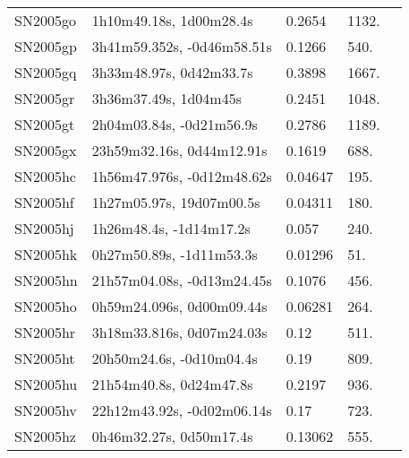 \begin{longtable}{lllll}
         SN2005go &        1h10m49.18s, 1d00m28.4s &   0.2654 &          1132. &    \citet{2011ApJ...740...92G} \\
         SN2005gp &     3h41m59.352s, -0d46m58.51s &   0.1266 &           540. &    \citet{2016SDSSD.C...0000:} \\
         SN2005gq &        3h33m48.97s, 0d42m33.7s &   0.3898 &          1667. &    \citet{2011ApJ...740...92G} \\
         SN2005gr &          3h36m37.49s, 1d04m45s &   0.2451 &          1048. &    \citet{2011ApJ...740...92G} \\
         SN2005gt &       2h04m03.84s, -0d21m56.9s &   0.2786 &          1189. &    \citet{2011ApJ...740...92G} \\
         SN2005gx &      23h59m32.16s, 0d44m12.91s &   0.1619 &           688. &    \citet{2011ApJ...740...92G} \\
         SN2005hc &     1h56m47.976s, -0d12m48.62s &  0.04647 &           195. &    \citet{2016SDSSD.C...0000:} \\
         SN2005hf &       1h27m05.97s, 19d07m00.5s &  0.04311 &           180. &  \citet{1997AandAS..123..411M} \\
         SN2005hj &        1h26m48.4s, -1d14m17.2s &    0.057 &           240. &    \citet{2010ApJ...713.1026D} \\
         SN2005hk &       0h27m50.89s, -1d11m53.3s &  0.01296 &            51. &    \citet{2016SDSSD.C...0000:} \\
         SN2005hn &     21h57m04.08s, -0d13m24.45s &   0.1076 &           456. &    \citet{2011ApJ...740...92G} \\
         SN2005ho &      0h59m24.096s, 0d00m09.44s &  0.06281 &           264. &    \citet{2001SDSSe.1...0000:} \\
         SN2005hr &      3h18m33.816s, 0d07m24.03s &     0.12 &           511. &    \citet{2005CBET..268A...1B} \\
         SN2005ht &       20h50m24.6s, -0d10m04.4s &     0.19 &           809. &    \citet{2005CBET..280A...1B} \\
         SN2005hu &        21h54m40.8s, 0d24m47.8s &   0.2197 &           936. &    \citet{2011ApJ...740...92G} \\
         SN2005hv &     22h12m43.92s, -0d02m06.14s &     0.17 &           723. &    \citet{2005CBET..280A...1B} \\
         SN2005hz &        0h46m32.27s, 0d50m17.4s &  0.13062 &           555. &    \citet{2016SDSSD.C...0000:} \\

\end{longtable}
